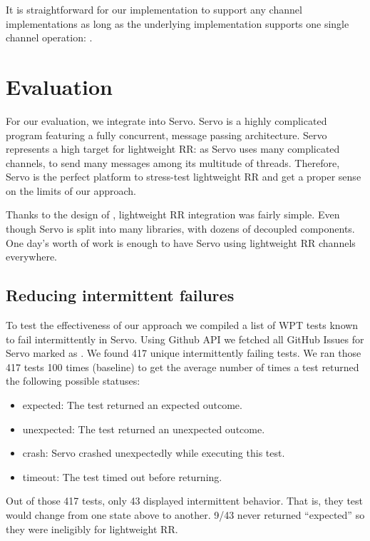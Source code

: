 It is straightforward for our  implementation to support
any channel implementations as long as the underlying implementation supports
one single channel operation: .

\section{Evaluation}
For our evaluation, we integrate  into Servo. Servo is a
highly complicated program featuring a fully concurrent, message passing architecture.
Servo represents a high target for lightweight RR: as Servo uses many complicated channels, to send many messages among its multitude of threads.
Therefore, Servo is the perfect platform to stress-test lightweight RR and get
a proper sense on the limits of our approach.

Thanks to the design of , lightweight RR integration was fairly simple.
Even though Servo is split into many libraries, with dozens of decoupled components. One
day's worth of work is enough to have Servo using lightweight RR channels everywhere.

\subsection{Reducing intermittent failures}

To test the effectiveness of our approach we compiled a list of WPT tests known to
fail intermittently in Servo. Using Github API we fetched all GitHub Issues for Servo
marked as . We found 417 unique intermittently failing tests.
We ran those 417 tests 100 times (baseline) to get the average number of times a
test returned the following possible statuses:
\begin{itemize}
  \item expected: The test returned an expected outcome.
  \item unexpected: The test returned an unexpected outcome.
  \item crash: Servo crashed unexpectedly while executing this test.
  \item timeout: The test timed out before returning.
\end{itemize}

Out of those 417 tests, only 43 displayed intermittent behavior. That is, they test
would change from one state above to another. 9/43 never returned
``expected'' so they were ineligibly for lightweight RR.

